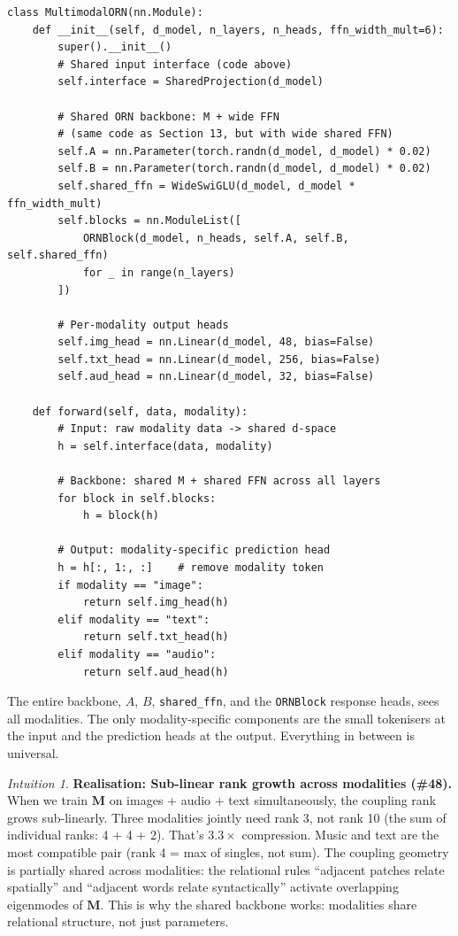 \documentclass[11pt, a4paper]{article}
\newcommand{\M}{\mathbf{M}}
\theoremstyle{remark}
\newtheorem*{intuition}{Intuition}
\begin{document}
\begin{lstlisting}[caption={Multimodal V3: shared projection feeds into shared backbone.}]
class MultimodalORN(nn.Module):
    def __init__(self, d_model, n_layers, n_heads, ffn_width_mult=6):
        super().__init__()
        # Shared input interface (code above)
        self.interface = SharedProjection(d_model)

        # Shared ORN backbone: M + wide FFN
        # (same code as Section 13, but with wide shared FFN)
        self.A = nn.Parameter(torch.randn(d_model, d_model) * 0.02)
        self.B = nn.Parameter(torch.randn(d_model, d_model) * 0.02)
        self.shared_ffn = WideSwiGLU(d_model, d_model * ffn_width_mult)
        self.blocks = nn.ModuleList([
            ORNBlock(d_model, n_heads, self.A, self.B, self.shared_ffn)
            for _ in range(n_layers)
        ])

        # Per-modality output heads
        self.img_head = nn.Linear(d_model, 48, bias=False)
        self.txt_head = nn.Linear(d_model, 256, bias=False)
        self.aud_head = nn.Linear(d_model, 32, bias=False)

    def forward(self, data, modality):
        # Input: raw modality data -> shared d-space
        h = self.interface(data, modality)

        # Backbone: shared M + shared FFN across all layers
        for block in self.blocks:
            h = block(h)

        # Output: modality-specific prediction head
        h = h[:, 1:, :]    # remove modality token
        if modality == "image":
            return self.img_head(h)
        elif modality == "text":
            return self.txt_head(h)
        elif modality == "audio":
            return self.aud_head(h)
\end{lstlisting}

\noindent
The entire backbone, $A$, $B$, \texttt{shared\_ffn}, and the \texttt{ORNBlock} response heads, sees all modalities.
The only modality-specific components are the small tokenisers at the input and the prediction heads at the output.
Everything in between is universal.

\begin{intuition}
\textbf{Realisation: Sub-linear rank growth across modalities (\#48).}
When we train $\M$ on images + audio + text simultaneously, the coupling rank grows sub-linearly.
Three modalities jointly need rank 3, not rank 10 (the sum of individual ranks: 4 + 4 + 2).
That's $3.3\times$ compression.
Music and text are the most compatible pair (rank 4 = max of singles, not sum).
The coupling geometry is partially shared across modalities: the relational rules ``adjacent patches relate spatially'' and ``adjacent words relate syntactically'' activate overlapping eigenmodes of $\M$.
This is why the shared backbone works: modalities share relational structure, not just parameters.
\end{intuition}
\end{document}
